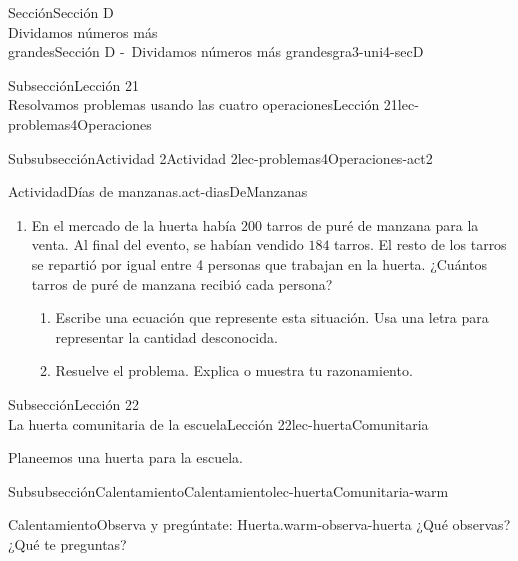 \begin{sectionptx}{Sección}{{\Large Sección D\\}Dividamos números más\\grandes}{}{Sección D -~Dividamos números más grandes}{}{}{gra3-uni4-secD}
\begin{subsectionptx}{Subsección}{{\normalsize Lección 21\\[-0.05cm]}Resolvamos problemas usando las cuatro operaciones}{}{Lección 21}{}{}{lec-problemas4Operaciones}
\begin{subsubsectionptx}{Subsubsección}{Actividad 2}{}{Actividad 2}{}{}{lec-problemas4Operaciones-act2}
\begin{activity}{Actividad}{Días de manzanas.}{act-diasDeManzanas}
\begin{enumerate}
\begin{enumerate}
\end{enumerate}
\item{}En el mercado de la huerta había \(200\) tarros de puré de manzana para la venta. Al final del evento, se habían vendido \(184\) tarros. El resto de los tarros se repartió por igual entre 4 personas que trabajan en la huerta. ¿Cuántos tarros de puré de manzana recibió cada persona?%
%
\begin{enumerate}
\item{}Escribe una ecuación que represente esta situación. Usa una letra para representar la cantidad desconocida.%
\item{}Resuelve el problema. Explica o muestra tu razonamiento.%
\end{enumerate}
\end{enumerate}
\end{activity}%
%
\end{subsubsectionptx}
\end{subsectionptx}
%
%
\typeout{************************************************}
\typeout{************************************************}
%
\begin{subsectionptx}{Subsección}{{\normalsize Lección 22\\[-0.05cm]}La huerta comunitaria de la escuela}{}{Lección 22}{}{}{lec-huertaComunitaria}
\begin{introduction}{}%
Planeemos una huerta para la escuela.%
\end{introduction}%
%
%
\typeout{************************************************}
\typeout{************************************************}
%
\begin{subsubsectionptx}{Subsubsección}{Calentamiento}{}{Calentamiento}{}{}{lec-huertaComunitaria-warm}
\begin{exploration}{Calentamiento}{Observa y pregúntate: Huerta.}{warm-observa-huerta}%
¿Qué observas?\\
 ¿Qué te preguntas?%
\begin{image}{0.125}{0.75}{0.125}{}%

\end{image}
\end{exploration}
\end{subsubsectionptx}
\end{subsectionptx}
\end{sectionptx}
